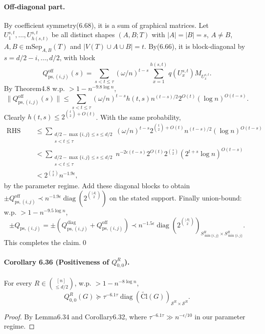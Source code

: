 \paragraph{Off-diagonal part.} By coefficient symmetry(6.68), it is a sum of graphical matrices. Let $U_1^{s,t},\ldots,U_{h(s,t)}^{s,t}$ be all distinct shapes $(A,B;T)$ with $|A|=|B|=s$, $A\ne B$, $A,B\in\mathrm{mSep}_{A,B}(T)$ and $|V(T)\cup A\cup B|=t$. By(6.66), it is block-diagonal by $s=d/2-i,\ldots,d/2$, with block
\[Q_{\mathrm{ps},(i,j)}^{\mathrm{off}}(s)=\sum_{s<t\le\tau}(\omega/n)^{t-s}\sum_{x=1}^{h(s,t)}q(U_x^{s,t})M_{U_x^{s,t}}.\]
By Theorem4.8 w.p. $>1-n^{-9.8\log n}$,
\[\|Q_{\mathrm{ps},(i,j)}^{\mathrm{off}}(s)\|\le\sum_{s<t\le\tau}(\omega/n)^{t-s}h(t,s)n^{(t-s)/2}2^{O(t)}(\log n)^{O(t-s)}.\tag{6.73}\]
Clearly $h(t,s)\le2^{\binom t2+O(t)}$. With the same probability,
\begin{align*}\text{RHS of(6.73)}&\le\sum_{\substack{d/2-\max\{i,j\}\le s\le d/2\\s<t\le\tau}}(\omega/n)^{t-s}2^{\binom t2+O(t)}n^{(t-s)/2}(\log n)^{O(t-s)}\\&<\sum_{\substack{d/2-\max\{i,j\}\le s\le d/2\\s<t\le\tau}}n^{-2\epsilon(t-s)}2^{O(t)}2^{\binom s2}(2^{t+s}\log n)^{O(t-s)}\\&<2^{\binom s2}n^{-1.9\epsilon},\end{align*}
by the parameter regime. Add these diagonal blocks to obtain $\pm Q_{\mathrm{ps},(i,j)}^{\mathrm{off}}\prec n^{-1.9\epsilon}\operatorname{diag}(2^{\binom{|A|}2})$ on the stated support. Finally union-bound: w.p. $>1-n^{-9.5\log n}$,
\[\pm Q_{\mathrm{ps},(i,j)}=\pm(Q_{\mathrm{ps},(i,j)}^{\mathrm{diag}}+Q_{\mathrm{ps},(i,j)}^{\mathrm{off}})\prec n^{-1.5\epsilon}\operatorname{diag}(2^{\binom{|A|}2})_{S^R_{\min\{i,j\}}\times S^R_{\min\{i,j\}}}.\]
This completes the claim.\qed
\paragraph{Corollary 6.36 (Positiveness of $Q_{0,0}^R$).} For every $R\in\binom{[n]}{\le d/2}$, w.p. $>1-n^{-8\log n}$,
\[Q_{0,0}^R(G)\succeq\tau^{-6.1\tau}\operatorname{diag}(\widetilde{\mathrm{Cl}}(G))_{\mathcal S^R\times\mathcal S^R}.\]
\begin{proof}By Lemma6.34 and Corollary6.32, where $\tau^{-6.1\tau}\gg n^{-\epsilon/10}$ in our parameter regime.\end{proof}
